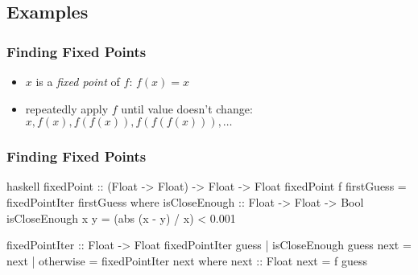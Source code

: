 \documentclass[dvipsnames]{beamer}
\theoremstyle{plain}
\begin{document}
\subsection{Examples}

\begin{frame}
  \frametitle{Finding Fixed Points}

  \begin{itemize}
    \item $x$ is a \emph{fixed point} of $f$: $f(x)=x$
    \item repeatedly apply $f$ until value doesn't change:\\
      $x,f(x),f(f(x)),f(f(f(x))),\ldots$
  \end{itemize}
\end{frame}

\begin{frame}[fragile]
  \frametitle{Finding Fixed Points}

  \begin{exampleblock}{}
    \begin{pygments}{haskell}
fixedPoint :: (Float -> Float) -> Float -> Float
fixedPoint f firstGuess = fixedPointIter firstGuess
  where
    isCloseEnough :: Float -> Float -> Bool
    isCloseEnough x y = (abs (x - y) / x) < 0.001

    fixedPointIter :: Float -> Float
    fixedPointIter guess
      | isCloseEnough guess next = next
      | otherwise                = fixedPointIter next
      where
        next :: Float
        next = f guess
    \end{pygments}
  \end{exampleblock}
\end{frame}
\end{document}

